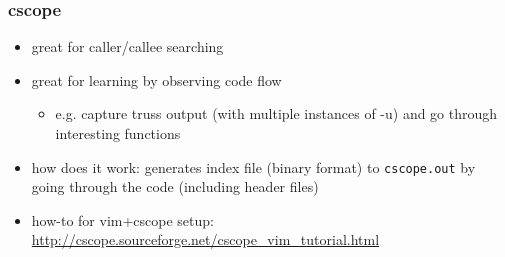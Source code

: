 \subsubsection{cscope}

\begin{itemize}
    \item great for caller/callee searching
    \item great for learning by observing code flow
      \begin{itemize}
      \item e.g. capture truss output (with multiple instances of -u) and 
        go through interesting functions
      \end{itemize}
    \item how does it work: generates index file (binary format) to
       \texttt{cscope.out} by going through the code (including header
       files)
    \item how-to for vim+cscope setup:
        \url{http://cscope.sourceforge.net/cscope\_vim\_tutorial.html}
\end{itemize}

